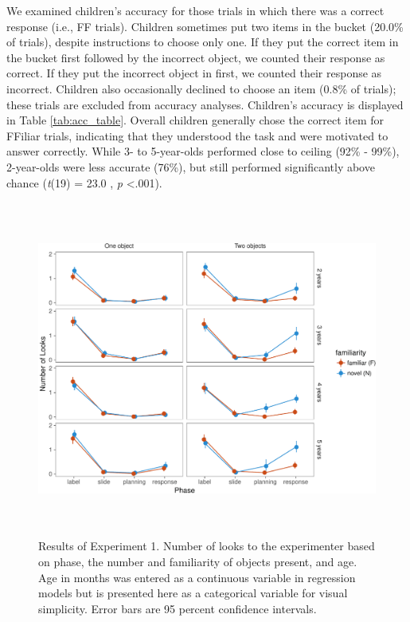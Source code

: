 \documentclass[a4paper,man,apacite,floatsintext]{apa6}
\newenvironment{CodeChunk}{}{}
\begin{document}
We examined children's accuracy for those trials in which there was a
correct response (i.e., FF trials). Children sometimes put two items in
the bucket (20.0\% of trials), despite instructions to choose only one.
If they put the correct item in the bucket first followed by the
incorrect object, we counted their response as correct. If they put the
incorrect object in first, we counted their response as incorrect.
Children also occasionally declined to choose an item (0.8\% of trials);
these trials are excluded from accuracy analyses. Children's accuracy is
displayed in Table \ref{tab:acc_table}. Overall children generally chose
the correct item for FFiliar trials, indicating that they understood the
task and were motivated to answer correctly. While 3- to 5-year-olds
performed close to ceiling (92\% - 99\%), 2-year-olds were less accurate
(76\%), but still performed significantly above chance (\emph{t}(19) =
23.0 , \emph{p} \textless{}.001).

\begin{CodeChunk}
\begin{figure}[b]

{\centering \includegraphics[width=5.75in,height=4.35in]{figs/results_e1-1} 

}

\caption[Results of Experiment 1]{Results of Experiment 1. Number of looks to the experimenter based on phase, the number and familiarity of objects present, and age. Age in months was entered as a continuous variable in regression models but is presented here as a categorical variable for visual simplicity. Error bars are 95 percent confidence intervals.}\label{fig:results_e1}
\end{figure}
\end{CodeChunk}
\end{document}
